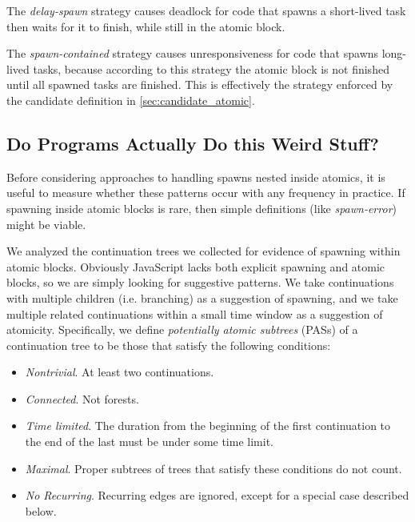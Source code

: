 \documentclass[acmsmall,anonymous,review]{acmart}\settopmatter{printfolios=true,printccs=false,printacmref=false}
\begin{document}
The \emph{delay-spawn} strategy causes deadlock for code that spawns a short-lived task then waits for it to finish, while still in the atomic block.

The \emph{spawn-contained} strategy causes unresponsiveness for code that spawns long-lived tasks, because according to this strategy the atomic block is not finished until all spawned tasks are finished.
This is effectively the strategy enforced by the candidate definition in \textsection\ref{sec:candidate_atomic}.


\subsection{Do Programs Actually Do this Weird Stuff?}

Before considering approaches to handling spawns nested inside atomics, it is useful to measure whether these patterns occur with any frequency in practice.
If spawning inside atomic blocks is rare, then simple definitions (like \emph{spawn-error}) might be viable.

We analyzed the continuation trees we collected for evidence of spawning within atomic blocks.
Obviously JavaScript lacks both explicit spawning and atomic blocks, so we are simply looking for suggestive patterns.
We take continuations with multiple children (i.e. branching) as a suggestion of spawning, and we take multiple related continuations within a small time window as a suggestion of atomicity.
Specifically, we define \emph{potentially atomic subtrees} (PASs) of a continuation tree to be those that satisfy the following conditions:

\begin{itemize}
\item \emph{Nontrivial}. At least two continuations.
\item \emph{Connected}. Not forests.
\item \emph{Time limited}. The duration from the beginning of the first continuation to the end of the last must be under some time limit.
\item \emph{Maximal}. Proper subtrees of trees that satisfy these conditions do not count.
\item \emph{No Recurring}. Recurring edges are ignored, except for a special case described below.
\end{itemize}
\end{document}
